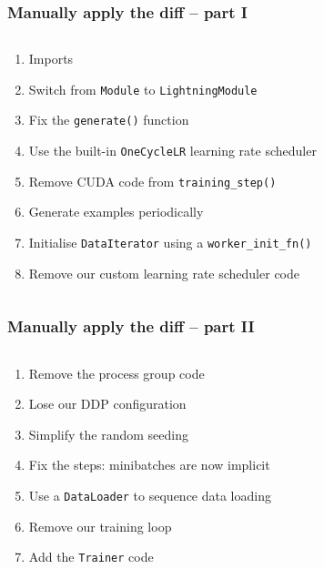\documentclass[
	notes=none,
	aspectratio=169
]{beamer}
\begin{document}
\begin{frame}
\frametitle{Manually apply the diff -- part I}

\begin{columns}[T]
\begin{column}[T]{1.0\textwidth}
\setlength{\parskip}{0.5em}

\vspace{0.0cm}
\begin{enumerate}
\setlength{\parskip}{0.0em}
\item Imports
\item Switch from {\tt Module} to {\tt LightningModule}
\item Fix the {\tt generate()} function
\item Use the built-in {\tt OneCycleLR} learning rate scheduler
\item Remove CUDA code from {\tt training\_step()}
\item Generate examples periodically
\item Initialise {\tt DataIterator} using a {\tt worker\_init\_fn()}
\item Remove our custom learning rate scheduler code
\end{enumerate}

\end{column}
\end{columns}

\end{frame}
\note{
}


\begin{frame}
\frametitle{Manually apply the diff -- part II}

\begin{columns}[T]
\begin{column}[T]{1.0\textwidth}
\setlength{\parskip}{0.5em}

\vspace{0.0cm}
\begin{enumerate}
\setlength{\parskip}{0.0em}
\setcounter{enumi}{8}
\item Remove the process group code
\item Lose our DDP configuration
\item Simplify the random seeding
\item Fix the steps: minibatches are now implicit
\item Use a {\tt DataLoader} to sequence data loading
\item Remove our training loop
\item Add the {\tt Trainer} code
\end{enumerate}

\end{column}
\end{columns}

\end{frame}
\note{
}
\end{document}
